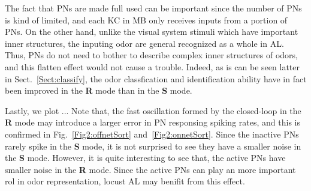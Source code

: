 \documentclass[12pt, a4paper]{article}
\begin{document}
The fact that PNs are made full used can be important since the number of PNs is kind of limited, and each KC in MB only receives inputs from a portion of PNs. %
On the other hand, unlike the visual system stimuli which have important inner structures, the inputing odor are general recognized as a whole in AL. Thus, PNs do not need to bother to describe complex inner structures of odors, and this flatten effect would not cause a trouble. Indeed, as is can be seen latter in Sect.~\ref{Sect:classify}, the odor classfication and identification ability have in fact been improved in the {\bf R} mode than in the {\bf S} mode.


Lastly, we plot ... Note that, the fast oscillation formed by the closed-loop in the {\bf R} mode may introduce a larger error in PN responsing spiking rates, and this is confirmed in Fig.~\ref{Fig2:offnetSort} and~\ref{Fig2:onnetSort}. Since the inactive PNs rarely spike in the {\bf S} mode, it is not surprised to see they have a smaller noise in the {\bf S} mode. However, it is quite interesting to see that, the active PNs have smaller noise in the {\bf R} mode. Since the active PNs can play an more important rol in odor representation, locust AL may benifit from this effect. %

\end{document}
